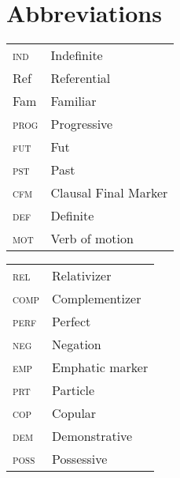 \documentclass[output=paper,modfonts,nonflat,draftmode]{langsci/langscibook}
\begin{document}
\section*{Abbreviations}
\begin{tabularx}{.5\textwidth}{@{}lQ@{}} 
\textsc{ind} & Indefinite \\
       {Ref} & Referential \\
       {Fam} & Familiar \\
\textsc{prog} & Progressive \\
\textsc{fut} & Fut \\
\textsc{pst} & Past \\
\textsc{cfm} & Clausal Final Marker \\
\textsc{def} & Definite  \\
\textsc{mot} & Verb of motion  \\
\end{tabularx}%
\begin{tabularx}{.5\textwidth}{@{}lQ@{}}
\textsc{rel} & Relativizer \\
\textsc{comp} & Complementizer \\
\textsc{perf} & Perfect \\
\textsc{neg} & Negation \\
\textsc{emp} & Emphatic marker \\
\textsc{prt} & Particle \\
\textsc{cop} & Copular  \\
\textsc{dem} & Demonstrative \\
\textsc{poss} & Possessive  \\
\end{tabularx}
\end{document}
